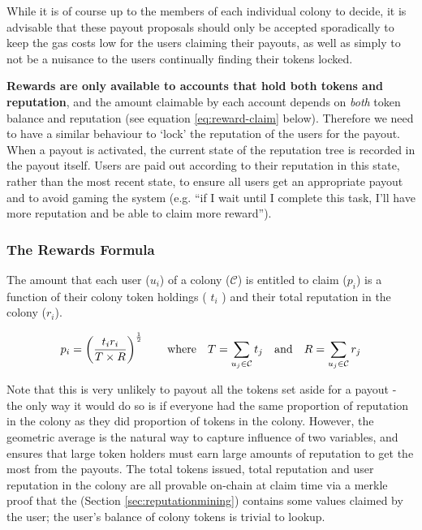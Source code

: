 While it is of course up to the members of each individual colony to decide, it is advisable that these payout proposals should only be accepted sporadically to keep the gas costs low for the users claiming their payouts, as well as simply to not be a nuisance to the users continually finding their tokens locked.

\textbf{Rewards are only available to accounts that hold both tokens and reputation}, and the amount claimable by each account depends on \emph{both} token balance and reputation (see equation \eqref{eq:reward-claim} below). Therefore we need to have a similar behaviour to `lock' the reputation of the users for the payout. When a payout is activated, the current state of the reputation tree is recorded in the payout itself. Users are paid out according to their reputation in this state, rather than the most recent state, to ensure all users get an appropriate payout and to avoid gaming the system (e.g. ``if I wait until I complete this task, I'll have more reputation and be able to claim more reward'').

\subsubsection*{The Rewards Formula}
The amount that each user ($u_i$) of a colony ($\mathcal{C}$) is entitled to claim ($p_i$) is a function of their colony token holdings ( $t_i$ ) and their total reputation in the colony ($r_i$).

\begin{equation}\label{eq:reward-claim}
 p_i = \left(\frac{t_i r_i}{T \times R}\right)^{\frac{1}{2}} \qquad \textnormal{where} \quad T = \sum\limits_{u_j\in \mathcal{C}} t_j \quad\textnormal{and}\quad R = \sum\limits_{u_j\in \mathcal{C}} r_j
\end{equation}

Note that this is very unlikely to payout all the tokens set aside for a payout - the only way it would do so is if everyone had the same proportion of reputation in the colony as they did proportion of tokens in the colony. However, the geometric average is the natural way to capture influence of two variables, and ensures that large token holders must earn large amounts of reputation to get the most from the payouts. The total tokens issued, total reputation and user reputation in the colony are all provable on-chain at claim time via a merkle proof that the  (Section \ref{sec:reputationmining}) contains some values claimed by the user; the user's balance of colony tokens is trivial to lookup.

